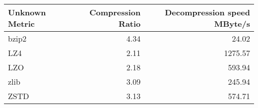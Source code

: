 
\begin{tabular}{lrr}
\hline
 Unknown Metric   &   Compression Ratio &   Decompression speed MByte/s \\
\hline
 bzip2            &                4.34 &                         24.02 \\
 LZ4              &                2.11 &                       1275.57 \\
 LZO              &                2.18 &                        593.94 \\
 zlib             &                3.09 &                        245.94 \\
 ZSTD             &                3.13 &                        574.71 \\
\hline
\end{tabular}